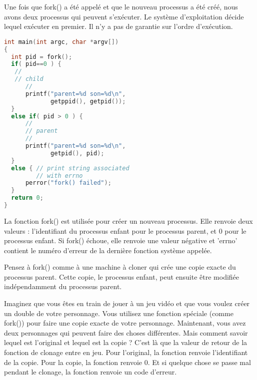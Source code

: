 \documentclass[12pt]{report}
\begin{document}
 Une fois que fork() a été appelé et que le nouveau processus a été créé, nous avons deux processus qui peuvent s'exécuter. Le système d'exploitation décide lequel exécuter en premier. Il n'y a pas de garantie sur l'ordre d'exécution.
\begin{lstlisting}[language=C]
int main(int argc, char *argv[])
{
  int pid = fork();
  if( pid==0 ) { 
   //
   // child
      //
      printf("parent=%d son=%d\n",
             getppid(), getpid());
  }
  else if( pid > 0 ) {
      //
      // parent
      //
      printf("parent=%d son=%d\n",
             getpid(), pid);
  }
  else { // print string associated
         // with errno   
      perror("fork() failed"); 
  }
  return 0;
}
\end{lstlisting}
\begin{tcolorbox}[colback=yellow!5, colframe=yellow!80!black, title={\faBookmark À retenir}]
La fonction fork() est utilisée pour créer un nouveau processus. Elle renvoie deux valeurs : l'identifiant du processus enfant pour le processus parent, et 0 pour le processus enfant. Si fork() échoue, elle renvoie une valeur négative et 'errno' contient le numéro d'erreur de la dernière fonction système appelée.
\end{tcolorbox}
\begin{tcolorbox}[colback=green!5, colframe=green!75!black, title={\faLightbulb Intuition}]
Pensez à fork() comme à une machine à cloner qui crée une copie exacte du processus parent. Cette copie, le processus enfant, peut ensuite être modifiée indépendamment du processus parent.
\end{tcolorbox}
\begin{tcolorbox}[colback=blue!5, colframe=blue!75!black, title={\faLightbulb Vulgarisation simple}]
Imaginez que vous êtes en train de jouer à un jeu vidéo et que vous voulez créer un double de votre personnage. Vous utilisez une fonction spéciale (comme fork()) pour faire une copie exacte de votre personnage. Maintenant, vous avez deux personnages qui peuvent faire des choses différentes. Mais comment savoir lequel est l'original et lequel est la copie ? C'est là que la valeur de retour de la fonction de clonage entre en jeu. Pour l'original, la fonction renvoie l'identifiant de la copie. Pour la copie, la fonction renvoie 0. Et si quelque chose se passe mal pendant le clonage, la fonction renvoie un code d'erreur.
\end{tcolorbox}
\end{document}
